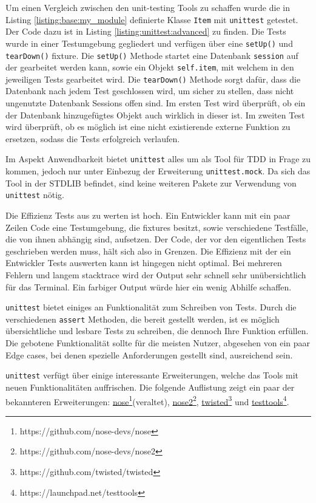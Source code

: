 Um einen Vergleich zwischen den unit-testing Tools zu schaffen wurde die in
Listing \ref{listing:base:my_module} definierte Klasse \lstinline{Item} mit
\lstinline{unittest} getestet. Der Code dazu ist in Listing
\ref{listing:unittest:advanced} zu finden.
Die Tests wurde in einer Testumgebung gegliedert und verfügen über eine
\lstinline{setUp()} und \lstinline{tearDown()} \Gls{fixture}. Die
\lstinline{setUp()} Methode startet eine Datenbank \lstinline{session} auf der
gearbeitet werden kann, sowie ein Objekt \lstinline{self.item}, mit welchem in
den jeweiligen Tests gearbeitet wird. Die \lstinline{tearDown()} Methode
sorgt dafür, dass die Datenbank nach jedem Test
geschlossen wird, um sicher zu stellen, dass nicht ungenutzte Datenbank Sessions
offen sind.
Im ersten Test wird überprüft, ob ein der Datenbank hinzugefügtes Objekt auch
wirklich in dieser ist. Im zweiten Test wird überprüft, ob es möglich
ist eine nicht existierende externe Funktion zu ersetzen, sodass die Tests
erfolgreich verlaufen.
\newline

Im Aspekt Anwendbarkeit bietet \lstinline|unittest| alles um als Tool für TDD in
Frage zu kommen, jedoch nur unter Einbezug der Erweiterung
\lstinline|unittest.mock|. Da sich das Tool in der STDLIB befindet, sind keine
weiteren Pakete zur Verwendung von \lstinline{unittest} nötig.

Die Effizienz Tests aus zu werten ist hoch. Ein Entwickler kann mit ein paar
Zeilen Code eine Testumgebung, die \Glspl{fixture} besitzt, sowie verschiedene 
Testfälle, die von ihnen abhängig sind, aufsetzen. Der Code, der vor den 
eigentlichen Tests geschrieben werden muss, hält sich also in Grenzen. Die
Effizienz mit der ein Entwickler Tests auswerten kann ist hingegen nicht 
optimal. Bei mehreren Fehlern und langem \gls{stacktrace} wird der Output sehr 
schnell sehr unübersichtlich für das Terminal. Ein farbiger Output würde hier 
ein wenig Abhilfe schaffen.

\lstinline{unittest} bietet einiges an Funktionalität zum Schreiben von Tests.
Durch die verschiedenen \lstinline{assert} Methoden, die bereit gestellt werden,
ist es möglich übersichtliche und lesbare Tests zu schreiben, die dennoch Ihre
Funktion erfüllen. Die gebotene Funktionalität sollte für die meisten Nutzer, 
abgesehen von ein paar Edge cases, bei denen spezielle Anforderungen  gestellt 
sind, ausreichend sein.

\lstinline{unittest} verfügt über einige interessante Erweiterungen, welche das 
Tools mit neuen Funktionalitäten auffrischen. Die folgende Auflistung zeigt ein 
paar der bekannteren Erweiterungen: 
\href{https://github.com/nose-devs/nose}{nose}\footnote{https://github.com/nose-devs/nose}(veraltet),
\href{https://github.com/nose-devs/nose2}{nose2}\footnote{https://github.com/nose-devs/nose2},
\href{https://github.com/twisted/twisted}{twisted}\footnote{https://github.com/twisted/twisted}
und
\href{https://launchpad.net/testtools}{testtools}\footnote{https://launchpad.net/testtools}.